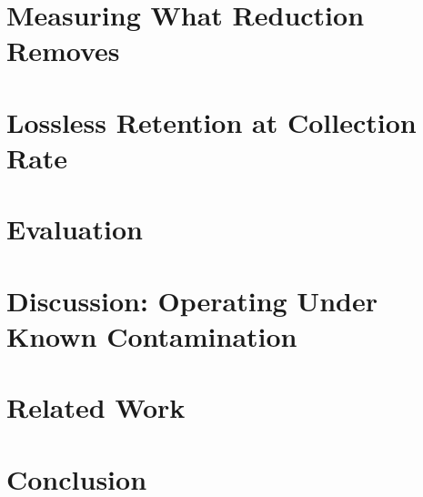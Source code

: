 \documentclass[letterpaper,twocolumn,10pt]{article}
\begin{document}
\section{Measuring What Reduction Removes}

\section{Lossless Retention at Collection Rate}

\section{Evaluation}

\section{Discussion: Operating Under Known Contamination}

\section{Related Work}
\section{Conclusion}



\end{document}
